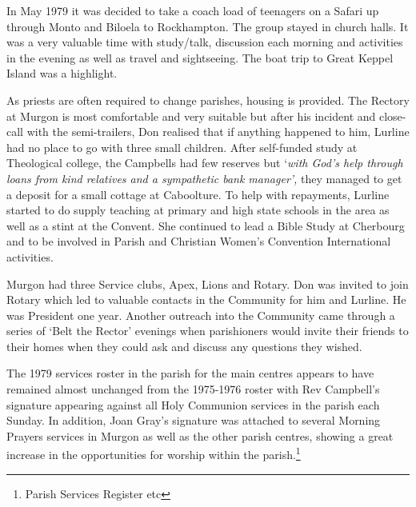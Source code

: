 In May 1979 it was decided to take a coach load of teenagers on a Safari up through Monto and Biloela to Rockhampton. The group stayed in church halls. It was a very valuable time with study/talk, discussion each morning and activities in the evening as well as travel and sightseeing. The boat trip to Great Keppel Island was a highlight.



As priests are often required to change parishes, housing is provided. The Rectory at Murgon is most comfortable and very suitable but after his incident and close-call with the semi-trailers, Don realised that if anything happened to him, Lurline had no place to go with three small children. After self-funded study at Theological college, the Campbells had few reserves but `\emph{with God's help through loans from kind relatives and a sympathetic bank manager',} they managed to get a deposit for a small cottage at Caboolture. To help with repayments, Lurline started to do supply teaching at primary and high state schools in the area as well as a stint at the Convent. She continued to lead a Bible Study at Cherbourg and to be involved in Parish and Christian Women's Convention International activities.



Murgon had three Service clubs, Apex, Lions and Rotary. Don was invited to join Rotary which led to valuable contacts in the Community for him and Lurline. He was President one year. Another outreach into the Community came through a series of `Belt the Rector' evenings when parishioners would invite their friends to their homes when they could ask and discuss any questions they wished.



The 1979 services roster in the parish for the main centres appears to have remained almost unchanged from the 1975-1976 roster with Rev Campbell's signature appearing against all Holy Communion services in the parish each Sunday. In addition, Joan Gray's signature was attached to several Morning Prayers services in Murgon as well as the other parish centres, showing a great increase in the opportunities for worship within the parish.\footnote{Parish Services Register etc}



